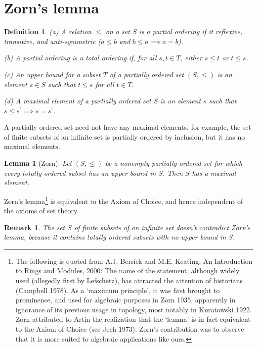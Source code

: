 \documentclass[a4paper,11pt,final,openany]{memoir}
\newtheorem{lemma}[X]{Lemma}
\newtheorem{definition}[X]{Definition}
\newtheorem{remark}[X]{Remark}
\theoremstyle{nonumberplain}
\begin{document}
\section{Zorn's lemma}

\begin{definition}
(a) A relation $\leq$ on a set $S$ is a \emph{partial ordering}%
%
\emph{ }if it reflexive, transitive, and anti-symmetric ($a\leq b$ and $b\leq
a\implies a=b$).

(b) A partial ordering is a \emph{total ordering}%
%
\emph{ }if, for all $s,t\in T$, either $s\leq t$ or $t\leq s$.

(c) An \emph{upper bound}%
for a subset $T$ of a partially ordered set $(S,\leq)$ is an element $s\in S$
such that $t\leq s$ for all $t\in T$.

(d) A \emph{maximal element}%
%
\emph{ }of a partially ordered set $S$ is an element $s$ such that $s\leq
s^{\prime}\implies s=s^{\prime}$.
\end{definition}

A partially ordered set need not have any maximal elements, for example, the
set of finite subsets of an infinite set is partially ordered by inclusion,
but it has no maximal elements.

\begin{lemma}
[Zorn]\label{sf14}Let $(S,\leq)$ be a nonempty partially ordered set for which
every totally ordered subset has an upper bound in $S$. Then $S$ has a maximal element.
\end{lemma}

Zorn's lemma\footnote{The following is quoted from A.J. Berrick and M.E.
Keating, An Introduction to Rings and Modules, 2000: The name of the
statement, although widely used (allegedly first by Lefschetz), has attracted
the attention of historians (Campbell 1978). As a `maximum principle', it was
first brought to prominence, and used for algebraic purposes in Zorn 1935,
apparently in ignorance of its previous usage in topology, most notably in
Kuratowski 1922. Zorn attributed to Artin the realization that the `lemma' is
in fact equivalent to the Axiom of Choice (see Jech 1973). Zorn's contribution
was to observe that it is more suited to algebraic applications like ours.} is
equivalent to the Axiom of Choice, and hence independent of the axioms of set theory.

\begin{remark}
\label{sf14m}The set $S$ of finite subsets of an infinite set doesn't
contradict Zorn's lemma, because it contains totally ordered subsets with no
upper bound in $S$.
\end{remark}
\end{document}
